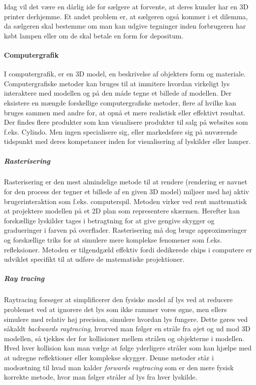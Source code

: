 Idag vil det være en dårlig ide for sælgere at forvente, at deres kunder har en 3D printer derhjemme. Et andet problem er, at sælgeren også kommer i et dilemma, da sælgeren skal bestemme om man kan udgive tegninger inden forbrugeren har købt lampen eller om de skal betale en form for depositum.

\paragraph{Computergrafik \cite{computergrafik_introduktion}}
I computergrafik, er en 3D model, en beskrivelse af objekters form og materiale. Computergrafiske metoder kan bruges til at immitere hvordan virkeligt lys interaktere med modellen og på den måde tegne et billede af modellen. Der eksistere en mængde forskellige computergrafiske metoder, flere af hvilke kan bruges sammen med andre for, at opnå et mere realistisk eller effektivt resultat. Der findes flere produkter som kan visualisere produkter til salg på websites som f.eks. Cylindo\cite{Cylindo}. Men ingen specialisere sig, eller markedsføre sig på nuværende tidspunkt med deres kompetancer inden for visualisering af lyskilder eller lamper.

\subparagraph{Rasterisering}
Rasterisering er den mest almindelige metode til at rendere (rendering er navnet for den process der tegner et billede af en given 3D model) miljøer med høj aktiv brugerinteraktion som f.eks. computerspil. Metoden virker ved rent mattematisk at projektere modellen på et 2D plan som representere skærmen. Herefter kan forskællige lyskilder tages i betragtning for at give gengive skygger og gradueringer i farven på overflader. Rasterisering må dog bruge approximeringer og forskællige triks for at simulere mere komplekse fenomener som f.eks. refleksioner. Metoden er tilgendgæld effektiv fordi dedikerede chips i computere er udviklet specifikt til at udføre de matematiske projektioner.

\subparagraph{Ray tracing \cite{raytracing_for_begyndere}}
Raytracing forsøger at simplificerer den fysiske model af lys ved at reducere problemet ved at ignorere det lys som ikke rammer vores øgne, men ellers simulere med relativ høj precision, simulere hvordan lys fungere. Dette gøres ved såkaldt \textit{backwards raytracing}, hvorved man følger en stråle fra øjet og ud mod 3D modellen, så tjekkes der for kollisioner mellem strålen og objekterne i modellen. Hved hver kollision kan man vælge at følge yderligere stråler som kan hjælpe med at udregne reflektioner eller komplekse skygger. Denne metoder står i modsætning til hvad man kalder \textit{forwards raytracing} som er den mere fysisk korrekte metode, hvor man følger stråler af lys fra hver lyskilde.

